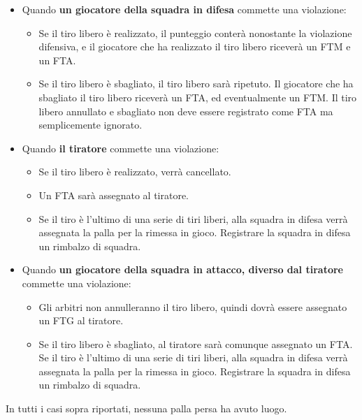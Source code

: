 \begin{itemize}

    \item Quando \textbf{un giocatore della squadra in difesa} commette una violazione:
        \begin{itemize}
            \item Se il tiro libero è realizzato, il punteggio conterà nonostante la violazione difensiva, e il giocatore che ha realizzato il tiro libero riceverà un FTM e un FTA.
            \item Se il tiro libero è sbagliato, il tiro libero sarà ripetuto. Il giocatore che ha sbagliato il tiro libero riceverà un FTA, ed eventualmente un FTM. Il tiro libero annullato e sbagliato non deve essere registrato come FTA ma semplicemente ignorato.
        \end{itemize}

    \item Quando \textbf{il tiratore} commette una violazione:
        \begin{itemize}
            \item Se il tiro libero è realizzato, verrà cancellato.
            \item Un FTA sarà assegnato al tiratore.
            \item Se il tiro è l'ultimo di una serie di tiri liberi, alla squadra in difesa verrà assegnata la palla per la rimessa in gioco. Registrare la squadra in difesa un rimbalzo di squadra.
        \end{itemize}

    \item Quando \textbf{un giocatore della squadra in attacco, diverso dal tiratore} commette una violazione:
        \begin{itemize}
            \item Gli arbitri non annulleranno il tiro libero, quindi dovrà essere assegnato un FTG al tiratore.
            \item Se il tiro libero è sbagliato, al tiratore sarà comunque assegnato un FTA. Se il tiro è l'ultimo di una serie di tiri liberi, alla squadra in difesa verrà assegnata la palla per la rimessa in gioco. Registrare la squadra in difesa un rimbalzo di squadra.
        \end{itemize}

\end{itemize}

In tutti i casi sopra riportati, nessuna palla persa ha avuto luogo.

